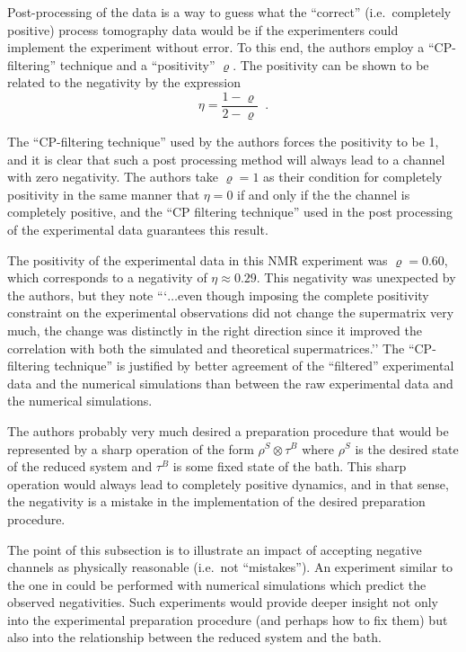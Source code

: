 Post-processing of the data is a way to guess what the ``correct'' (i.e.\ completely positive) process tomography data would be if the experimenters could implement the experiment without error.  To this end, the authors employ a ``CP-filtering'' technique \cite{Havel2003} and a ``positivity'' $\varrho$.  The positivity can be shown to be related to the negativity by the expression 
$$
\eta = \frac{1 - \varrho}{2 - \varrho}\;\;.
$$

The ``CP-filtering technique'' used by the authors forces the positivity to be 1, and it is clear that such a post processing method will always lead to a channel with zero negativity.  The authors take $\varrho=1$ as their condition for completely positivity in the same manner that $\eta=0$ if and only if the the channel is completely positive, and the ``CP filtering technique'' used in the post processing of the experimental data guarantees this result.

The positivity of the experimental data in this NMR experiment was $\varrho=0.60$, which corresponds to a negativity of $\eta\approx 0.29$.  This negativity was unexpected by the authors, but they note ```$\ldots$even though imposing the complete positivity constraint on the experimental observations did not change the supermatrix very much, the change was distinctly in the right direction since it improved the correlation with both the simulated and theoretical supermatrices.''  The ``CP-filtering technique'' is justified by better agreement of the ``filtered'' experimental data and the numerical simulations than between the raw experimental data and the numerical simulations.  

The authors probably very much desired a preparation procedure that would be represented by a sharp operation of the form $\rho^S\otimes\tau^B$ where $\rho^S$ is the desired state of the reduced system and $\tau^B$ is some fixed state of the bath.  This sharp operation would always lead to completely positive dynamics, and in that sense, the negativity is a mistake in the implementation of the desired preparation procedure.  

The point of this subsection is to illustrate an impact of accepting negative channels as physically reasonable (i.e.\ not ``mistakes'').  An experiment similar to the one in \cite{Cory2004} could be performed with numerical simulations which predict the observed negativities.  Such experiments would provide deeper insight not only into the experimental preparation procedure (and perhaps how to fix them) but also into the relationship between the reduced system and the bath.  


